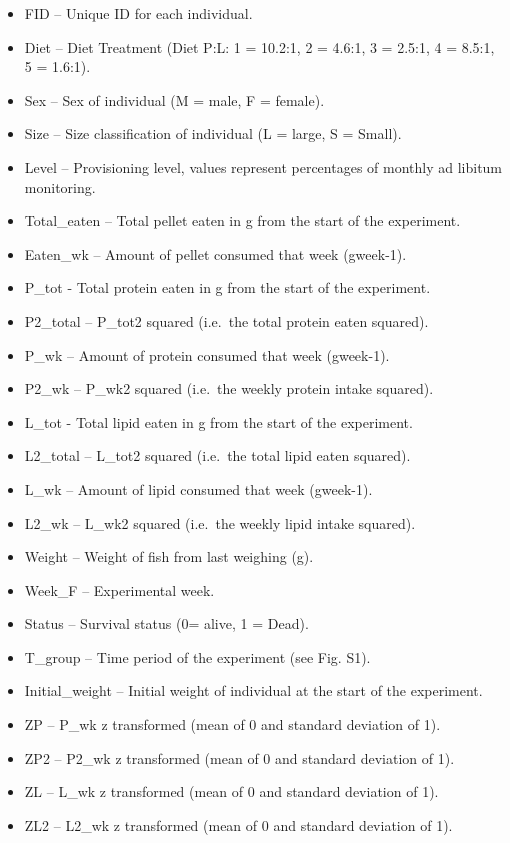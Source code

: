 \documentclass[]{book}
\providecommand{\tightlist}{%
  \setlength{\itemsep}{0pt}\setlength{\parskip}{0pt}}
\begin{document}
\begin{itemize}
\tightlist
\item
  FID -- Unique ID for each individual.
\item
  Diet -- Diet Treatment (Diet P:L: 1 = 10.2:1, 2 = 4.6:1, 3 = 2.5:1, 4 = 8.5:1, 5 = 1.6:1).
\item
  Sex -- Sex of individual (M = male, F = female).
\item
  Size -- Size classification of individual (L = large, S = Small).
\item
  Level -- Provisioning level, values represent percentages of monthly ad libitum monitoring.
\item
  Total\_eaten -- Total pellet eaten in g from the start of the experiment.
\item
  Eaten\_wk -- Amount of pellet consumed that week (gweek-1).
\item
  P\_tot - Total protein eaten in g from the start of the experiment.
\item
  P2\_total -- P\_tot2 squared (i.e.~the total protein eaten squared).
\item
  P\_wk -- Amount of protein consumed that week (gweek-1).
\item
  P2\_wk -- P\_wk2 squared (i.e.~the weekly protein intake squared).
\item
  L\_tot - Total lipid eaten in g from the start of the experiment.
\item
  L2\_total -- L\_tot2 squared (i.e.~the total lipid eaten squared).
\item
  L\_wk -- Amount of lipid consumed that week (gweek-1).
\item
  L2\_wk -- L\_wk2 squared (i.e.~the weekly lipid intake squared).
\item
  Weight -- Weight of fish from last weighing (g).
\item
  Week\_F -- Experimental week.
\item
  Status -- Survival status (0= alive, 1 = Dead).
\item
  T\_group -- Time period of the experiment (see Fig. S1).
\item
  Initial\_weight -- Initial weight of individual at the start of the experiment.
\item
  ZP -- P\_wk z transformed (mean of 0 and standard deviation of 1).
\item
  ZP2 -- P2\_wk z transformed (mean of 0 and standard deviation of 1).
\item
  ZL -- L\_wk z transformed (mean of 0 and standard deviation of 1).
\item
  ZL2 -- L2\_wk z transformed (mean of 0 and standard deviation of 1).
\end{itemize}
\end{document}
